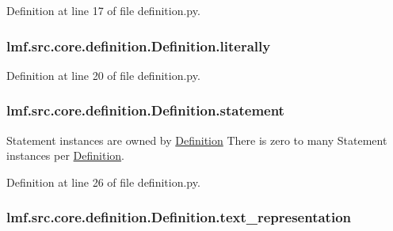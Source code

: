 Definition at line 17 of file definition.\+py.

\hypertarget{classlmf_1_1src_1_1core_1_1definition_1_1_definition_a03094eec5215fece01b3412c14e357f2}{
\subsubsection[{literally}]{\setlength{\rightskip}{0pt plus 5cm}lmf.\+src.\+core.\+definition.\+Definition.\+literally}}\label{classlmf_1_1src_1_1core_1_1definition_1_1_definition_a03094eec5215fece01b3412c14e357f2}


Definition at line 20 of file definition.\+py.

\hypertarget{classlmf_1_1src_1_1core_1_1definition_1_1_definition_acc8776ce9e16149eef1968f2bb1edd79}{
\subsubsection[{statement}]{\setlength{\rightskip}{0pt plus 5cm}lmf.\+src.\+core.\+definition.\+Definition.\+statement}}\label{classlmf_1_1src_1_1core_1_1definition_1_1_definition_acc8776ce9e16149eef1968f2bb1edd79}


Statement instances are owned by \hyperlink{classlmf_1_1src_1_1core_1_1definition_1_1_definition}{Definition} There is zero to many Statement instances per \hyperlink{classlmf_1_1src_1_1core_1_1definition_1_1_definition}{Definition}. 



Definition at line 26 of file definition.\+py.

\hypertarget{classlmf_1_1src_1_1core_1_1definition_1_1_definition_abae8500dbd7200fa3d76f5599ff00d37}{
\subsubsection[{text\+\_\+representation}]{\setlength{\rightskip}{0pt plus 5cm}lmf.\+src.\+core.\+definition.\+Definition.\+text\+\_\+representation}}\label{classlmf_1_1src_1_1core_1_1definition_1_1_definition_abae8500dbd7200fa3d76f5599ff00d37}



